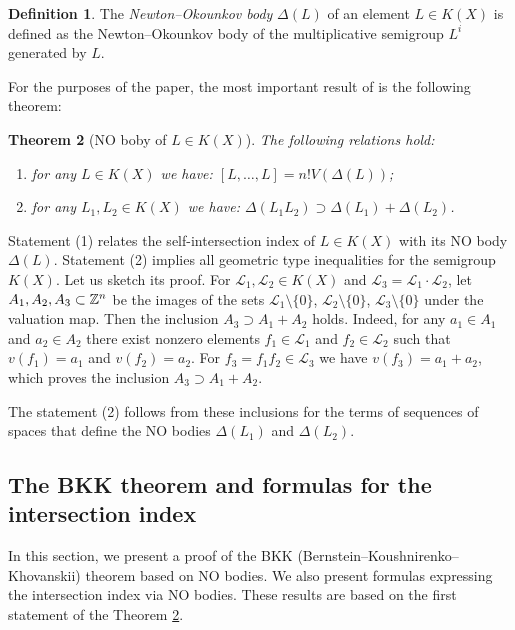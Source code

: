 \documentclass[11pt]{article}
\theoremstyle{plain}
\newtheorem{theorem}{Theorem}[section]
\theoremstyle{definition}
\newtheorem{definition}[theorem]{Definition}
\begin{document}
\begin{definition}  The {\it Newton--Okounkov body} $\Delta( L)$  of an element $L\in K(X)$ is defined as the Newton--Okounkov body of the multiplicative semigroup $L^i$ generated by $L$.
\end{definition}

 For the purposes of the paper, the most important result of  \cite{K-K12} is the following theorem:

\begin{theorem}[NO boby of $L\in K(X)$]\label{main}
The following relations hold:

\begin{enumerate}
\item for any $L \in K(X)$ we have:  $[L,\dots, L] = n! V(\Delta(L))$;

\item for any $L_1,L_2 \in K(X)$ we have:  $\Delta(L_1L_2) \supset  \Delta(L_1) + \Delta(L_2)$.
\end{enumerate}
\end{theorem}

Statement (1)  relates the self-intersection index of $L\in K(X)$ with its NO body $\Delta(L)$.  Statement (2)   implies all geometric type inequalities for the semigroup $K(X)$.
 Let us sketch its  proof. For $\mathcal L_1, \mathcal L_2\in K(X)$  and $\mathcal L_3=\mathcal L_1 \cdot \mathcal L_2$, let $A_1, A_2,A_3\subset \Bbb Z^n$ be the images of the sets  $\mathcal L_1\setminus\{0\}$, $\mathcal L_2\setminus\{0\}$, $\mathcal L_3\setminus\{0\}$ under the valuation map. Then the inclusion  $A_3\supset A_1 +A_2$ holds. Indeed, for any $a_1\in A_1$ and $a_2\in A_2$  there exist nonzero elements  $f_1\in \mathcal L_1$ and $f_2\in \mathcal L _2$ such that $v(f_1)=a_1$ and $v(f_2)=a_2$. For $f_3=f_1f_2 \in \mathcal L_3$ we have  $v(f_3)=a_1+a_2$, which proves the inclusion $A_3\supset A_1+A_2$.

The statement (2) follows from these inclusions for the terms of  sequences of spaces that define the NO bodies $\Delta(L_1)$ and $\Delta(L_2)$.

\subsection{The BKK theorem and  formulas for the intersection index}\label{subsec7.2}
In this section, we present a proof of the BKK (Bernstein--Koushnirenko--Khovanskii) theorem based on NO bodies. We also present   formulas expressing the intersection index via NO bodies. These results  are based on the first statement of the Theorem \ref{main}.
\end{document}
